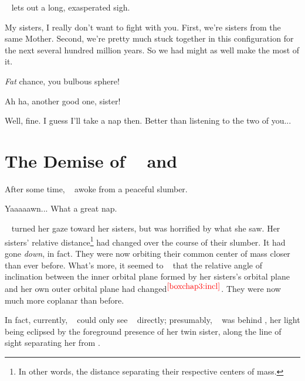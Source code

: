\documentclass[main.tex]{subfiles}
\begin{document}
\par \nar \rmcelaeno~ lets out a long, exasperated sigh.

\par \Celaeno My sisters, I really don't want to fight with you.  First, we're sisters from the same Mother.  Second, we're pretty much stuck together in this configuration for the next several hundred million years.  So we had might as well make the most of it.

\par \Taygete \textit{Fat} chance, you bulbous sphere!

\par \Alcyone Ah ha, another good one, sister!

\par \Celaeno Well, fine.  I guess I'll take a nap then.  Better than listening to the two of you...

\section{The Demise of \rmtaygete~ and \rmalcyone}

\par \nar After some time, \rmcelaeno~ awoke from a peaceful slumber.  

\par \Celaeno Yaaaaawn... What a great nap. 

\par \nar \rmcelaeno~ turned her gaze toward her sisters, but was horrified by what she saw.  Her sisters' relative distance\footnote{In other words, the distance separating their respective centers of mass.} had changed over the course of their slumber.  It had gone \textit{down}, in fact.  They were now orbiting their common center of mass closer than ever before.  What's more, it seemed to \rmcelaeno~ that the relative angle of inclination between the inner orbital plane formed by her sisters's orbital plane and her own outer orbital plane had changed$^{\textcolor{red}{\ref{boxchap3:incl}}}$.  They were now much more coplanar than before.


\par \nar  In fact, currently, \rmcelaeno~ could only see \rmalcyone~ directly; presumably, \rmtaygete~ was behind \rmalcyone, her light being eclipsed by the foreground presence of her twin sister, along the line of sight separating her from \rmcelaeno.
\end{document}
